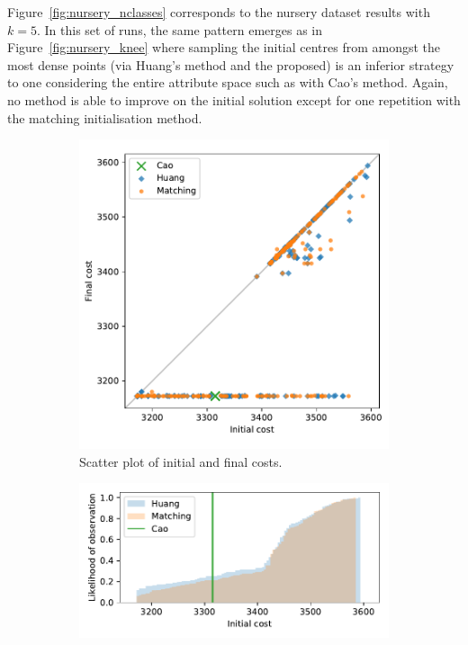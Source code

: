 \documentclass[smallextended]{svjour3}
\begin{document}
Figure~\ref{fig:nursery_nclasses} corresponds to the nursery dataset results
with \(k=5\). In this set of runs, the same pattern emerges as in
Figure~\ref{fig:nursery_knee} where sampling the initial centres from amongst
the most dense points (via Huang's method and the proposed) is an inferior
strategy to one considering the entire attribute space such as with Cao's
method. Again, no method is able to improve on the initial solution except for
one repetition with the matching initialisation method.

\begin{figure}
    \begin{subfigure}{.5\textwidth}
        \includegraphics[width=\linewidth]{Fig5a.pdf}
        \caption{Scatter plot of initial and final costs.}
    \end{subfigure}
    \hfill%
    \begin{subfigure}{.5\textwidth}
        \includegraphics[width=\linewidth]{Fig5b1.pdf}


\end{subfigure}
\end{figure}
\end{document}

